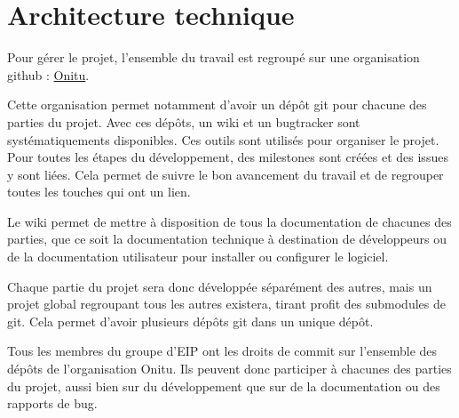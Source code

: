\section{Architecture technique}

Pour gérer le projet, l'ensemble du travail est regroupé sur une organisation github : \href{https://github.com/onitu/}{Onitu}.

Cette organisation permet notamment d'avoir un dépôt git pour chacune des parties du projet. Avec ces dépôts, un wiki et un bugtracker sont systématiquements disponibles. Ces outils sont utilisés pour organiser le projet. Pour toutes les étapes du développement, des milestones sont créées et des issues y sont liées. Cela permet de suivre le bon avancement du travail et de regrouper toutes les touches qui ont un lien.

Le wiki permet de mettre à disposition de tous la documentation de chacunes des parties, que ce soit la documentation technique à destination de développeurs ou de la documentation utilisateur pour installer ou configurer le logiciel.

Chaque partie du projet sera donc développée séparément des autres, mais un projet global regroupant tous les autres existera, tirant profit des submodules de git. Cela permet d'avoir plusieurs dépôts git dans un unique dépôt.

Tous les membres du groupe d'EIP ont les droits de commit sur l'ensemble des dépôts de l'organisation Onitu. Ils peuvent donc participer à chacunes des parties du projet, aussi bien sur du développement que sur de la documentation ou des rapports de bug.
